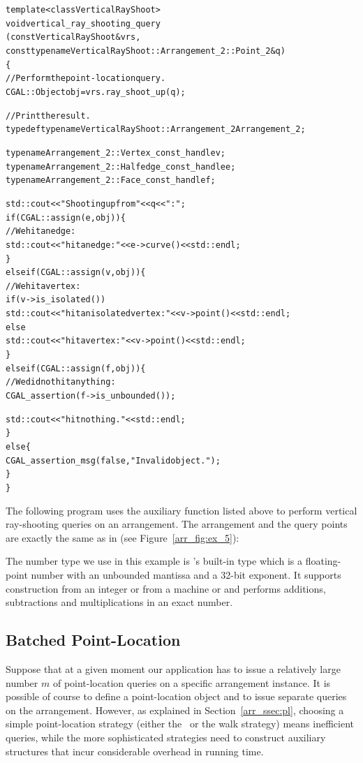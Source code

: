 \begin{alltt}
template <class VerticalRayShoot>
void vertical_ray_shooting_query
    (const VerticalRayShoot& vrs,
     const typename VerticalRayShoot::Arrangement_2::Point_2& q)
\{
  // Perform the point-location query.
  CGAL::Object    obj = vrs.ray_shoot_up (q);

  // Print the result.
  typedef typename VerticalRayShoot::Arrangement_2  Arrangement_2;

  typename Arrangement_2::Vertex_const_handle    v;
  typename Arrangement_2::Halfedge_const_handle  e;
  typename Arrangement_2::Face_const_handle      f;

  std::cout << "Shooting up from " << q << " : "; 
  if (CGAL::assign (e, obj)) \{
    // We hit an edge:
    std::cout << "hit an edge: " << e->curve() << std::endl;
  \}
  else if (CGAL::assign (v, obj)) \{
    // We hit a vertex:
    if (v->is_isolated())
      std::cout << "hit an isolated vertex: " << v->point() << std::endl;
    else
      std::cout << "hit a vertex: " << v->point() << std::endl;
  \}
  else if (CGAL::assign (f, obj)) \{
    // We did not hit anything:
    CGAL_assertion (f->is_unbounded());
    
    std::cout << "hit nothing." << std::endl; 
  \}
  else \{
    CGAL_assertion_msg (false, "Invalid object.");
  \}
\}
\end{alltt}

The following program uses the auxiliary function listed above to
perform vertical ray-shooting queries on an arrangement.
The arrangement and the query points are exactly the same as in
 (see Figure~\ref{arr_fig:ex_5}):


The number type we use in this example is \cgal's built-in
 type which is a floating-point number with an
unbounded mantissa and a 32-bit exponent. It supports construction from an
integer or from a machine  or  and performs additions,
subtractions and multiplications in an exact number.

\subsection{Batched Point-Location}
\label{arr_ssec:batched_pl}
%
Suppose that at a given moment our application has to issue a
relatively large number $m$ of point-location queries on a
specific arrangement instance. It is possible of course to define
a point-location object and to issue separate queries on the
arrangement. However, as explained in Section~\ref{arr_ssec:pl},
choosing a simple point-location strategy (either the \naive\ or
the walk strategy) means inefficient queries, while the more
sophisticated strategies need to construct auxiliary structures
that incur considerable overhead in running time.

